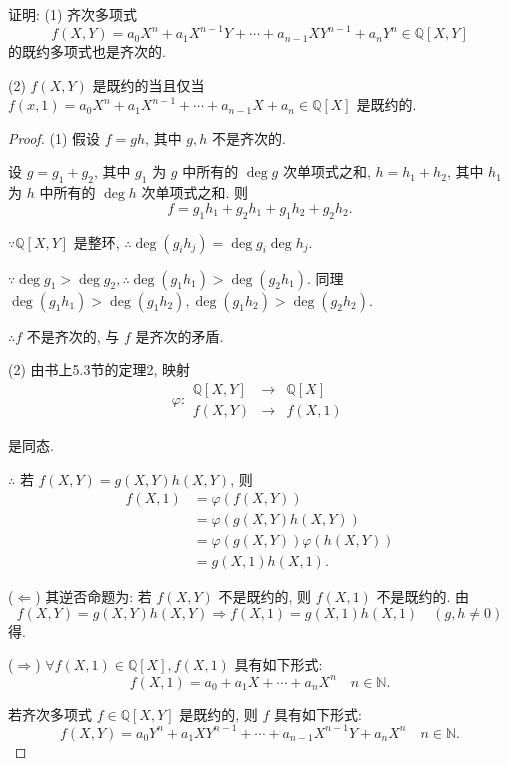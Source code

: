 \documentclass[UTF8]{ctexart}
\begin{document}
\begin{exercise}%
    证明: (1) 齐次多项式
    \[f(X,Y)=a_0X^n+a_1X^{n-1}Y+\cdots+a_{n-1}XY^{n-1}+a_nY^n\in\mathbb{Q}[X,Y]\]
    的既约多项式也是齐次的.
    
    (2) $f(X,Y)$ 是既约的当且仅当 $f(x,1)=a_0X^n+a_1X^{n-1}+\cdots+a_{n-1}X+a_n\in\mathbb{Q}[X]$ 是既约的.
\end{exercise}
\begin{proof}
    (1) 假设 $f=gh$, 其中 $g,h$ 不是齐次的.

    设 $g=g_1+g_2$, 其中 $g_1$ 为 $g$ 中所有的 $\deg g$ 次单项式之和, $h=h_1+h_2$, 其中 $h_1$ 为 $h$ 中所有的 $\deg h$ 次单项式之和. 则
    \[f=g_1h_1+g_2h_1+g_1h_2+g_2h_2.\]

    $\because\mathbb{Q}[X,Y]$ 是整环, $\therefore\deg(g_ih_j)=\deg g_i\deg h_j$.
    
    $\because\deg g_1>\deg g_2,\therefore\deg(g_1h_1)>\deg(g_2h_1)$. 同理 $\deg(g_1h_1)>\deg(g_1h_2),\deg(g_1h_2)>\deg(g_2h_2)$.

    $\therefore f$ 不是齐次的, 与 $f$ 是齐次的矛盾.

    (2) 由书上5.3节的定理2, 映射
    \[\varphi:\begin{array}{rcl}
        \mathbb{Q}[X,Y] & \to & \mathbb{Q}[X] \\
        f(X,Y) & \to & f(X,1)
    \end{array}\]

    是同态.

    $\therefore$ 若 $f(X,Y)=g(X,Y)h(X,Y)$, 则
    \begin{align*}
        f(X,1) & =\varphi(f(X,Y)) \\
        & =\varphi(g(X,Y)h(X,Y)) \\
        & =\varphi(g(X,Y))\varphi(h(X,Y)) \\
        & =g(X,1)h(X,1).
    \end{align*}

    ($\Leftarrow$) 其逆否命题为: 若 $f(X,Y)$ 不是既约的, 则 $f(X,1)$ 不是既约的. 由
    \[f(X,Y)=g(X,Y)h(X,Y)\Rightarrow f(X,1)=g(X,1)h(X,1)\quad(g,h\neq0)\]
    得.
    
    ($\Rightarrow$) $\forall f(X,1)\in\mathbb{Q}[X],f(X,1)$ 具有如下形式:
    \begin{equation}\label{eq4.4}
        f(X,1)=a_0+a_1X+\cdots+a_nX^n\quad n\in\mathbb{N}.
    \end{equation}

    若齐次多项式 $f\in\mathbb{Q}[X,Y]$ 是既约的, 则 $f$ 具有如下形式:
    \begin{equation}\label{eq4.5}
        f(X,Y)=a_0Y^n+a_1XY^{n-1}+\cdots+a_{n-1}X^{n-1}Y+a_nX^n\quad n\in\mathbb{N}.
    \end{equation}


\end{proof}
\end{document}
